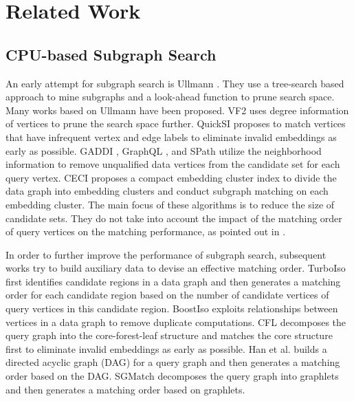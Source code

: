 \section{Related Work}
\subsection{CPU-based Subgraph Search}
An early attempt for subgraph search is Ullmann \cite{ullmann1976algorithm}. They use a tree-search based approach to mine subgraphs and a look-ahead function to prune search space. Many works \cite{cordella2001improved, shang2008taming,zhang2009gaddi,he2008graphs,zhao2010graph} based on Ullmann have been proposed. VF2 \cite{cordella2001improved} uses degree information of vertices to prune the search space further. QuickSI \cite{shang2008taming} proposes to match vertices that have infrequent vertex and edge labels to eliminate invalid embeddings as early as possible. GADDI \cite{zhang2009gaddi}, GraphQL \cite{he2008graphs}, and SPath \cite{zhao2010graph} utilize the neighborhood information to remove unqualified data vertices from the candidate set for each query vertex. CECI \cite{bhattarai2019ceci} proposes a compact embedding cluster index to divide the data graph into embedding clusters and conduct subgraph matching on each embedding cluster. The main focus of these algorithms is to reduce the size of candidate sets. They do not take into account the impact of the matching order of query vertices on the matching performance, as pointed out in \cite{lee2012depth}.

In order to further improve the performance of subgraph search, subsequent works \cite{han2013turboiso,ren2015exploiting,bi2016efficient,han2019efficient,rivero2017efficient} try to build auxiliary data to devise an effective matching order. TurboIso \cite{han2013turboiso} first identifies candidate regions in a data graph and then generates a matching order for each candidate region based on the number of candidate vertices of query vertices in this candidate region. BoostIso \cite{ren2015exploiting} exploits relationships between vertices in a data graph to remove duplicate computations. CFL \cite{bi2016efficient} decomposes the query graph into the core-forest-leaf structure and matches the core structure first to eliminate invalid embeddings as early as possible. Han et al. \cite{han2019efficient} builds a directed acyclic graph (DAG) for a query graph and then generates a matching order based on the DAG. SGMatch \cite{rivero2017efficient} decomposes the query graph into graphlets and then generates a matching order based on graphlets.

